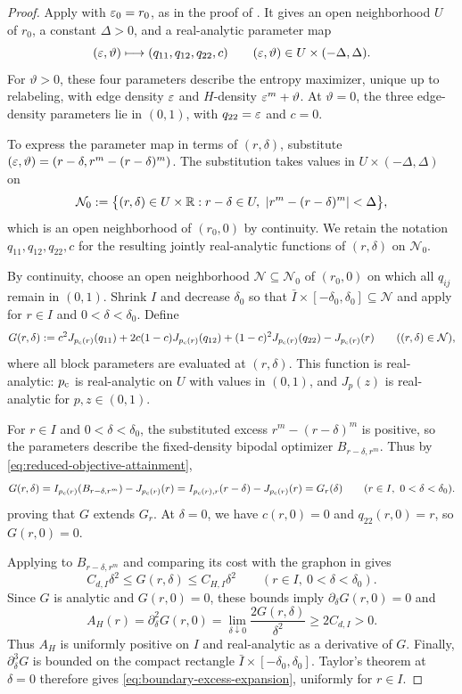 \begin{proof}
Apply  with $\varepsilon_0=r_0$, as in the proof
of .  It gives an open neighborhood $U$
of $r_0$, a constant $\Delta>0$, and a real-analytic parameter map
\[
  (\varepsilon,\vartheta)\longmapsto(q_{11},q_{12},q_{22},c)
  \qquad (\varepsilon,\vartheta)\in U\times(-\Delta,\Delta).
\]
For $\vartheta>0$, these four parameters describe the entropy maximizer,
unique up to relabeling, with edge density $\varepsilon$ and $H$-density
$\varepsilon^m+\vartheta$.  At $\vartheta=0$, the three edge-density parameters
lie in $(0,1)$, with $q_{22}=\varepsilon$ and $c=0$.

To express the parameter map in terms of $(r,\delta)$, substitute
$(\varepsilon,\vartheta)=(r-\delta,r^m-(r-\delta)^m)$.
The substitution takes values in $U\times(-\Delta,\Delta)$ on
\[
  \mathcal N_0:=\bigl\{(r,\delta)\in U\times\mathbb R:
  r-\delta\in U,\ \lvert r^m-(r-\delta)^m\rvert<\Delta\bigr\},
\]
which is an open neighborhood of $(r_0,0)$ by continuity.
We retain the notation $q_{11},q_{12},q_{22},c$ for the resulting jointly
real-analytic functions of $(r,\delta)$ on $\mathcal N_0$.

By continuity, choose an open neighborhood $\mathcal N\subseteq\mathcal N_0$
of $(r_0,0)$ on which all $q_{ij}$ remain in $(0,1)$.
Shrink $I$ and decrease $\delta_0$ so that
$\bar I\times[-\delta_0,\delta_0]\subseteq\mathcal N$ and
apply 
for $r\in I$ and $0<\delta<\delta_0$.  Define
\[
  G(r,\delta):=
  c^2J_{p_{\mathrm c}(r)}(q_{11})+2c(1-c)J_{p_{\mathrm c}(r)}(q_{12})
  +(1-c)^2J_{p_{\mathrm c}(r)}(q_{22})-J_{p_{\mathrm c}(r)}(r)
  \qquad ((r,\delta)\in\mathcal N),
\]
where all block parameters are evaluated at $(r,\delta)$.
This function is real-analytic: $p_{\mathrm c}$ is real-analytic on $U$ with values
in $(0,1)$, and $J_p(z)$ is real-analytic for $p,z\in(0,1)$.

For $r\in I$ and $0<\delta<\delta_0$, the substituted excess
$r^m-(r-\delta)^m$ is positive, so the parameters describe the fixed-density
bipodal optimizer $B_{r-\delta,r^m}$.
Thus by \eqref{eq:reduced-objective-attainment},
\[
  G(r,\delta)
  =I_{p_{\mathrm c}(r)}(B_{r-\delta,r^m})-J_{p_{\mathrm c}(r)}(r)
  =I_{p_{\mathrm c}(r),r}(r-\delta)-J_{p_{\mathrm c}(r)}(r)
  =G_r(\delta)
  \qquad (r\in I,\ 0<\delta<\delta_0).
\]
proving that $G$ extends $G_r$.
At $\delta=0$, we have $c(r,0)=0$ and $q_{22}(r,0)=r$, so $G(r,0)=0$.

Applying  to $B_{r-\delta,r^m}$ and
comparing its cost with the graphon in  gives
\[
  C_{d,I}\delta^2\le G(r,\delta)\le C_{H,I}\delta^2
  \qquad(r\in I,\ 0<\delta<\delta_0).
\]
Since $G$ is analytic and $G(r,0)=0$, these bounds imply
$\partial_\delta G(r,0)=0$ and
\[
  A_H(r)=\partial_\delta^2G(r,0)
  =\lim_{\delta\downarrow0}\frac{2G(r,\delta)}{\delta^2}\ge2C_{d,I}>0.
\]
Thus $A_H$ is uniformly positive on $I$ and real-analytic as a derivative of $G$.
Finally, $\partial_\delta^3G$ is bounded on the compact rectangle
$\bar I\times[-\delta_0,\delta_0]$.  Taylor's theorem at $\delta=0$ therefore
gives \eqref{eq:boundary-excess-expansion}, uniformly for $r\in I$.
\end{proof}


